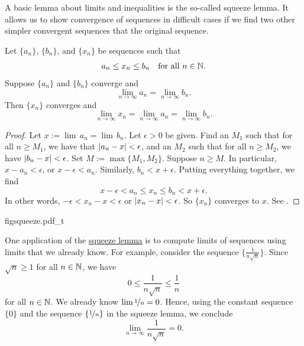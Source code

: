 A basic lemma about limits and inequalities is the so-called squeeze lemma.
It allows us to show convergence of sequences in difficult cases
if we find two other simpler convergent sequences that 
 the original sequence.

\begin{lemma} \label{squeeze:lemma}
Let $\{ a_n \}$, 
$\{ b_n \}$, and 
$\{ x_n \}$ be sequences such that
\begin{equation*}
a_n \leq x_n \leq b_n \quad \text{for all } n \in {\mathbb{N}}.
\end{equation*}
Suppose $\{ a_n \}$ and $\{ b_n \}$ converge and
\begin{equation*}
\lim_{n\to \infty} a_n
=
\lim_{n\to \infty} b_n .
\end{equation*}
Then $\{ x_n \}$ converges and
\begin{equation*}
\lim_{n\to \infty} x_n
=
\lim_{n\to \infty} a_n
=
\lim_{n\to \infty} b_n .
\end{equation*}
\end{lemma}

\begin{proof}
Let $x := \lim\, a_n = \lim\, b_n$.
Let $\epsilon > 0$ be given.
Find an $M_1$ such that for all $n \geq M_1$, we have
that $\left\lvert {a_n-x} \right\rvert < \epsilon$, and an $M_2$
such that for all $n \geq M_2$,
we have $\left\lvert {b_n-x} \right\rvert < \epsilon$.  Set $M := \max \{M_1, M_2 \}$.
Suppose $n \geq M$.
In particular,
$x - a_n < \epsilon$, or 
$x - \epsilon < a_n$.  Similarly, $b_n < x + \epsilon$.
Putting everything together, we find
\begin{equation*}
x - \epsilon < a_n \leq x_n \leq b_n < x + \epsilon .
\end{equation*}
In other words, $-\epsilon < x_n-x < \epsilon$ or $\left\lvert {x_n-x} \right\rvert < \epsilon$.
So $\{x_n\}$ converges to $x$.
See .
\end{proof}

\begin{myfigureht}
{figsqueeze.pdf_t}
\caption{Squeeze lemma proof in picture.\label{figsqueeze}}
\end{myfigureht}

\begin{example}
One application of
the \hyperref[squeeze:lemma]{squeeze lemma} is to compute limits of 
sequences using limits that we already know.  For example, consider
the sequence $\{ \frac{1}{n\sqrt{n}} \}$.
Since $\sqrt{n} \geq 1$ for all $n \in {\mathbb{N}}$, we have
\begin{equation*}
0 \leq \frac{1}{n\sqrt{n}} \leq \frac{1}{n}
\end{equation*}
for all $n \in {\mathbb{N}}$.  We already know $\lim \nicefrac{1}{n} = 0$. 
Hence, using
the constant sequence $\{ 0 \}$ and the sequence $\{ \nicefrac{1}{n} \}$ in the
squeeze lemma, we conclude
\begin{equation*}
\lim_{n\to\infty} \frac{1}{n\sqrt{n}} = 0 .
\end{equation*}
\end{example}


